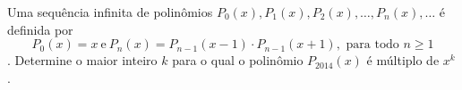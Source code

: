 Uma sequência infinita de polinômios $P_0(x), P_1(x), P_2(x), \dots, P_n(x), \dots$ é definida por
$$P_0(x) = x \ \mathrm{e}\  P_n(x) = P_{n-1}(x - 1) \cdot P_{n-1}(x + 1),\text{\ para todo\ }n \ge 1$$.
Determine o maior inteiro $k$ para o qual o polinômio $P_{2014}(x)$ é múltiplo de $x^k$.
